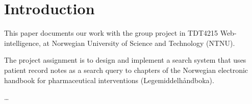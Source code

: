 \chapter{Introduction}
\label{cha:Introduction}

This paper documents our work with the group project in TDT4215
Web-intelligence, at Norwegian University of Science and Technology (NTNU).

The project assignment is to design and implement a search system that uses
patient record notes as a search query to chapters of the Norwegian electronic
handbook for pharmaceutical interventions (Legemiddelhåndboka)\cite{nlh}.

\ldots
